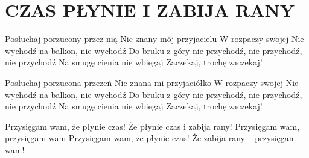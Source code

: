 \documentclass[../../../songbook.tex]{subfiles}
\begin{document}
\TabPositions{8cm} %
\section*{CZAS PŁYNIE I ZABIJA RANY}
\vspace{0.5cm}

Posłuchaj porzucony przez nią					 \newline
Nie znany mój przyjacielu						 \newline
W rozpaczy swojej								 \newline
Nie wychodź na balkon, nie wychodź				 \newline
Do bruku z góry nie przychodź, nie przychodź, nie przychodź	 \newline
Na smugę cienia nie wbiegaj									 \newline
Zaczekaj, trochę zaczekaj!									 \newline

Posłuchaj porzucona przezeń					 \newline	
Nie znana mi przyjaciółko					 \newline
W rozpaczy swojej							 \newline
Nie wychodź na balkon, nie wychodź			\newline
Do bruku z góry nie przychodź, nie przychodź, nie przychodź	 \newline
Na smugę cienia nie wbiegaj						 \newline
Zaczekaj, trochę zaczekaj!					 \newline

Przysięgam wam, że płynie czas!		 \newline
Że płynie czas i zabija rany!		 \newline
Przysięgam wam, przysięgam wam		 \newline
Przysięgam wam, że płynie czas!		 \newline
Że zabija rany – przysięgam wam!	 \newline
\end{document}
